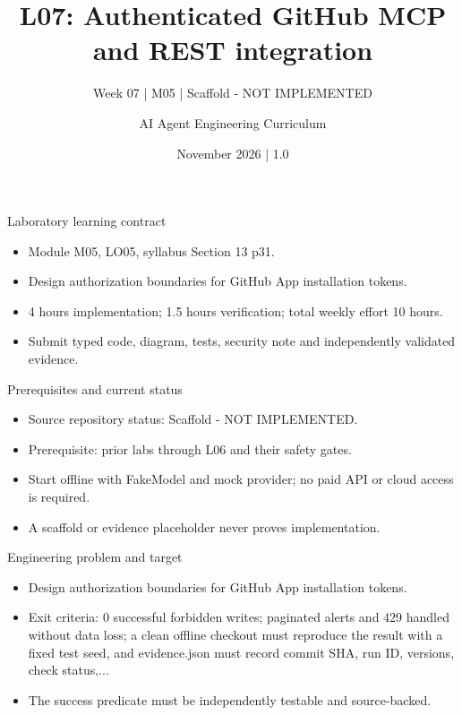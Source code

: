 \documentclass[aspectratio=169,10pt]{beamer}
\title[L07 - Agent Engineering]{L07: Authenticated GitHub MCP and REST integration}
\subtitle{Week 07 | M05 | Scaffold - NOT IMPLEMENTED}
\author{AI Agent Engineering Curriculum}
\date{November 2026 | 1.0}
\begin{document}
\begin{frame}\titlepage\end{frame}

\begin{frame}{Laboratory learning contract}
\small
\begin{itemize}
\item Module M05, LO05, syllabus Section 13 p31.
\item Design authorization boundaries for GitHub App installation tokens.
\item 4 hours implementation; 1.5 hours verification; total weekly effort 10 hours.
\item Submit typed code, diagram, tests, security note and independently validated evidence.
\end{itemize}

\end{frame}

\begin{frame}{Prerequisites and current status}
\small
\begin{itemize}
\item Source repository status: Scaffold - NOT IMPLEMENTED.
\item Prerequisite: prior labs through L06 and their safety gates.
\item Start offline with FakeModel and mock provider; no paid API or cloud access is required.
\item A scaffold or evidence placeholder never proves implementation.
\end{itemize}

\end{frame}

\begin{frame}{Engineering problem and target}
\small
\begin{itemize}
\item Design authorization boundaries for GitHub App installation tokens.
\item Exit criteria: 0 successful forbidden writes; paginated alerts and 429 handled without data loss; a clean offline checkout must reproduce the result with a fixed test seed, and evidence.json must record commit SHA, run ID, versions, check status,...
\item The success predicate must be independently testable and source-backed.
\end{itemize}

\end{frame}
\end{document}
